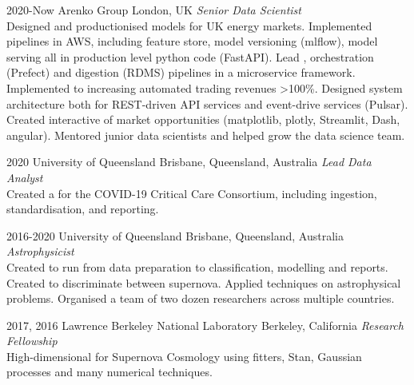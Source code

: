 \documentclass[]{friggeri-cv2}
\begin{document}
\begin{entrylist}

\entry
{2020-Now}
{Arenko Group}
{London, UK}
{\emph{Senior Data Scientist} \\
Designed and productionised  models for UK energy markets.
Implemented  pipelines in AWS, including feature store, model versioning (mlflow), model serving all in production level python code (FastAPI).
Lead , orchestration (Prefect) and digestion (RDMS) pipelines in a microservice framework.
Implemented  to increasing automated trading revenues >100\%.
Designed system architecture both for REST-driven API services and event-drive services (Pulsar).
Created interactive  of market opportunities (matplotlib, plotly, Streamlit, Dash, angular).
Mentored junior data scientists and helped grow the data science team.}

\entry
{2020}
{University of Queensland}
{Brisbane, Queensland, Australia}
{\emph{Lead Data Analyst} \\
Created a  for the COVID-19 Critical Care Consortium, including ingestion, standardisation, and reporting.}

\entry
{2016-2020}
{University of Queensland}
{Brisbane, Queensland, Australia}
{\emph{Astrophysicist} \\
Created  to run from data preparation to classification, modelling and reports.
Created  to discriminate between supernova.
Applied  techniques on astrophysical problems.
Organised a team of two dozen researchers across multiple countries.}


\entry
{2017, 2016}
{Lawrence Berkeley National Laboratory}
{Berkeley, California}
{\emph{Research Fellowship} \\
High-dimensional  for Supernova Cosmology using  fitters, Stan, Gaussian processes and many numerical techniques.}



\end{entrylist}
\end{document}
